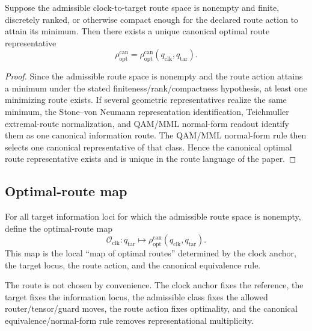 \begin{theorem}
\label{thm:v410r10-clock-anchored-canonical-optimal-route-principle}
Suppose the admissible clock-to-target route space is nonempty and finite,
discretely ranked, or otherwise compact enough for the declared route action to
attain its minimum. Then there exists a unique canonical optimal route
representative
\[
 \rho_{\mathrm{opt}}^{\mathrm{can}}
 =
 \rho_{\mathrm{opt}}^{\mathrm{can}}(q_{\mathrm{clk}},q_{\mathrm{tar}}).
\]
\end{theorem}

\begin{proof}
Since the admissible route space is nonempty and the route action attains a
minimum under the stated finiteness/rank/compactness hypothesis, at least one
minimizing route exists. If several geometric representatives realize the same
minimum, the Stone--von Neumann representation identification, Teichmuller
extremal-route normalization, and QAM/MML normal-form readout identify them as
one canonical information route. The QAM/MML normal-form rule then selects one
canonical representative of that class. Hence the canonical optimal route
representative exists and is unique in the route language of the paper.
\end{proof}

\subsection{Optimal-route map}
\label{subsec:v410r10-optimal-route-map}

\begin{definition}
\label{def:v410r10-clock-anchored-optimal-route-map}
For all target information loci for which the admissible route space is
nonempty, define the optimal-route map
\[
 \mathcal O_{\mathrm{clk}}:
 q_{\mathrm{tar}}
 \longmapsto
 \rho_{\mathrm{opt}}^{\mathrm{can}}
 (q_{\mathrm{clk}},q_{\mathrm{tar}}).
\]
This map is the local ``map of optimal routes'' determined by the clock anchor,
the target locus, the route action, and the canonical equivalence rule.
\end{definition}

\begin{remark}
\label{rem:v410r10-stronger-than-arbitrary-path-choice}
The route is not chosen by convenience. The clock anchor fixes the reference,
the target fixes the information locus, the admissible class fixes the allowed
router/tensor/guard moves, the route action fixes optimality, and the canonical
equivalence/normal-form rule removes representational multiplicity.
\end{remark}

